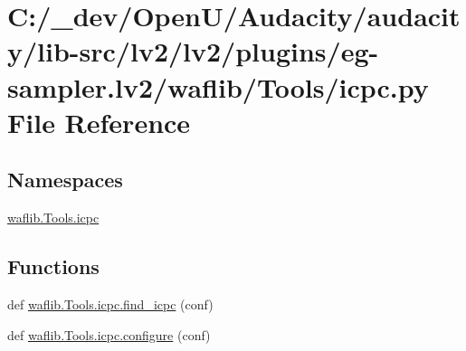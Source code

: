 \hypertarget{lv2_2plugins_2eg-sampler_8lv2_2waflib_2_tools_2icpc_8py}{}\section{C\+:/\+\_\+dev/\+Open\+U/\+Audacity/audacity/lib-\/src/lv2/lv2/plugins/eg-\/sampler.lv2/waflib/\+Tools/icpc.py File Reference}
\label{lv2_2plugins_2eg-sampler_8lv2_2waflib_2_tools_2icpc_8py}
\subsection*{Namespaces}
\begin{DoxyCompactItemize}
\item 
 \hyperlink{namespacewaflib_1_1_tools_1_1icpc}{waflib.\+Tools.\+icpc}
\end{DoxyCompactItemize}
\subsection*{Functions}
\begin{DoxyCompactItemize}
\item 
def \hyperlink{namespacewaflib_1_1_tools_1_1icpc_a3f1e8dd3ca1313cf570316c73027db11}{waflib.\+Tools.\+icpc.\+find\+\_\+icpc} (conf)
\item 
def \hyperlink{namespacewaflib_1_1_tools_1_1icpc_ac5e97f409d9392b945bef908e0e7f9cd}{waflib.\+Tools.\+icpc.\+configure} (conf)
\end{DoxyCompactItemize}
